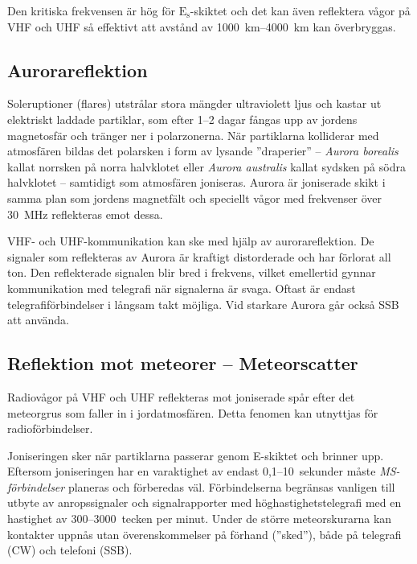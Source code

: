 Den kritiska frekvensen är hög för \(\mathrm{E_s}\)-skiktet och det kan även
reflektera vågor på VHF och UHF så effektivt att avstånd av
\SIrange{1000}{4000}{\kilo\metre} kan överbryggas.

\subsection{Aurorareflektion}

Soleruptioner (flares) utstrålar stora mängder ultraviolett ljus och kastar ut
elektriskt laddade partiklar, som efter 1--2 dagar fångas upp av jordens
magnetosfär och tränger ner i polarzonerna.
När partiklarna kolliderar med atmosfären bildas det polarsken i form av lysande
''draperier'' -- \emph{Aurora borealis} kallat norrsken på norra halvklotet
eller \emph{Aurora australis} kallat sydsken på södra halvklotet -- samtidigt
som atmosfären joniseras.
Aurora är joniserade skikt i samma plan som jordens magnetfält och speciellt
vågor med frekvenser över \SI{30}{\mega\hertz} reflekteras emot dessa.

VHF- och UHF-kommunikation kan ske med hjälp av aurorareflektion.
De signaler som reflekteras av Aurora är kraftigt distorderade och har förlorat
all ton.
Den reflekterade signalen blir bred i frekvens, vilket emellertid gynnar
kommunikation med telegrafi när signalerna är svaga.
Oftast är endast telegrafiförbindelser i långsam takt möjliga.
Vid starkare Aurora går också SSB att använda.

\subsection{Reflektion mot meteorer -- Meteorscatter}

Radiovågor på VHF och UHF reflekteras mot joniserade spår efter det
meteorgrus som faller in i jordatmosfären.
Detta fenomen kan utnyttjas för radioförbindelser.

Joniseringen sker när partiklarna passerar genom E-skiktet och brinner upp.
Eftersom joniseringen har en varaktighet av endast 0,1--10~sekunder måste
\emph{MS-förbindelser} planeras och förberedas väl.
Förbindelserna begränsas vanligen till utbyte av anropssignaler och
signalrapporter med höghastighetstelegrafi med en hastighet av
300--3000~tecken per minut.
Under de större meteorskurarna kan kontakter uppnås utan överenskommelser på
förhand (''sked''), både på telegrafi (CW) och telefoni (SSB).

